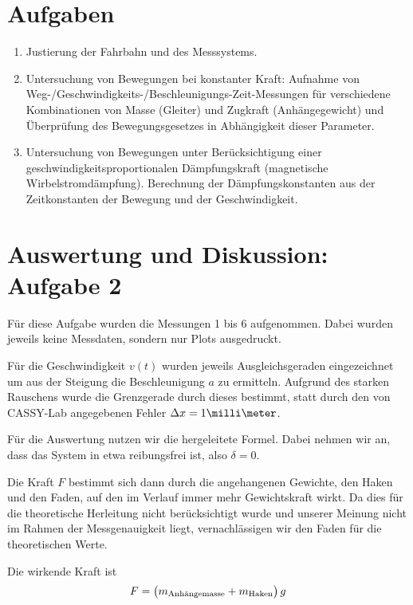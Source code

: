 \documentclass[a4paper,german,12pt,smallheadings]{scrartcl}
\begin{document}
\section*{Aufgaben}
\begin{enumerate}[1.]
  \item
    Justierung der Fahrbahn und des Messsystems.
  \item
    Untersuchung von Bewegungen bei konstanter Kraft: Aufnahme von
    Weg-/Geschwindigkeits-/Beschleunigungs-Zeit-Messungen für verschiedene
    Kombinationen von Masse (Gleiter) und Zugkraft (Anhängegewicht) und
    Überprüfung des Bewegungsgesetzes in Abhängigkeit dieser Parameter.
  \item
    Untersuchung von Bewegungen unter Berücksichtigung einer
    geschwindigkeitsproportionalen Dämpfungskraft (magnetische
    Wirbelstromdämpfung). Berechnung der Dämpfungskonstanten aus der
    Zeitkonstanten der Bewegung und der Geschwindigkeit.
\end{enumerate}

\newpage

\section*{Auswertung und Diskussion: Aufgabe 2}
Für diese Aufgabe wurden die Messungen 1 bis 6 aufgenommen. Dabei wurden
jeweils keine Messdaten, sondern nur Plots ausgedruckt.

Für die Geschwindigkeit $v(t)$ wurden jeweils Ausgleichsgeraden eingezeichnet
um aus der Steigung die Beschleunigung $a$ zu ermitteln. Aufgrund des starken
Rauschens wurde die Grenzgerade durch dieses bestimmt, statt durch den von
CASSY-Lab angegebenen Fehler $\Delta x = 1 \milli\meter$.

Für die Auswertung nutzen wir die hergeleitete Formel. Dabei nehmen wir an,
dass das System in etwa reibungsfrei ist, also $\delta = 0$.

Die Kraft $F$ bestimmt sich dann durch die angehangenen Gewichte, den Haken und
den Faden, auf den im Verlauf immer mehr Gewichtskraft wirkt. Da dies für die
theoretische Herleitung nicht berücksichtigt wurde und unserer Meinung nicht im
Rahmen der Messgenauigkeit liegt, vernachlässigen wir den Faden für die
theoretischen Werte.

Die wirkende Kraft ist
\begin{equation}
  F = \del{m_\text{Anhängemasse} + m_\text{Haken}} g
\end{equation}
\end{document}
